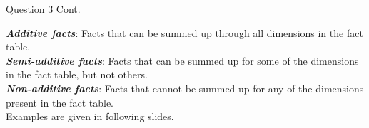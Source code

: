 \begin{frame}[fragile]{Question 3 Cont.}

\textbf{\textit{Additive facts}}: Facts that can be summed up through all dimensions in the fact table.
\\ \vspace{5pt}
\textbf{\textit{Semi-additive facts}}: Facts that can be summed up for some of the dimensions in the fact table, but not others.
\\ \vspace{5pt}
\textbf{\textit{Non-additive facts}}: Facts that cannot be summed up for any of the dimensions present in the fact table.\\\vspace{15pt}
Examples are given in following slides.
\end{frame}

